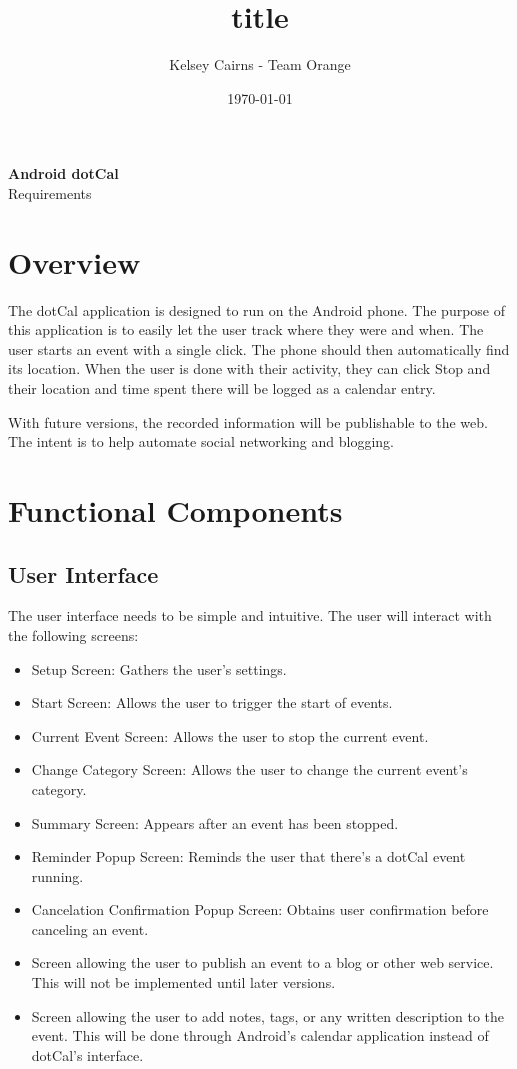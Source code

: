 \documentclass[11pt]{article}
\title{title}
\author{Kelsey Cairns - Team Orange}
\date{\today} %
\newcommand{\bt}[1]{{\sc  #1}}
\begin{document}
\begin{centering}
\textbf{\huge{Android dotCal}}\\
\LARGE{Requirements}

\end{centering}

\tableofcontents

\section{Overview}

The dotCal application is designed to run on the Android phone. The purpose of this application is to easily let the user track where they were and when. The user starts an event with a single click. The phone should then automatically find its location. When the user is done with their activity, they can click \bt{Stop} and their location and time spent there will be logged as a calendar entry.

With future versions, the recorded information will be publishable to the web. The intent is to help automate social networking and blogging.

\section{Functional Components}

\subsection{User Interface}

The user interface needs to be simple and intuitive. The user will interact with the following screens:

\begin{itemize}
	\item{Setup Screen: Gathers the user's settings.}
	\item{Start Screen: Allows the user to trigger the start of events.}
	\item{Current Event Screen: Allows the user to stop the current event.}
	\item{Change Category Screen: Allows the user to change the current event's category.}
	\item{Summary Screen: Appears after an event has been stopped.}
	\item{Reminder Popup Screen: Reminds the user that there's a dotCal event running.}
	\item{Cancelation Confirmation Popup Screen: Obtains user confirmation before canceling an event.}
	\item{Screen allowing the user to publish an event to a blog or other web service. This will not be implemented until later versions.}
	\item{Screen allowing the user to add notes, tags, or any written description to the event. This will be done through Android's calendar application instead of dotCal's interface.}
\end{itemize}
\end{document}
